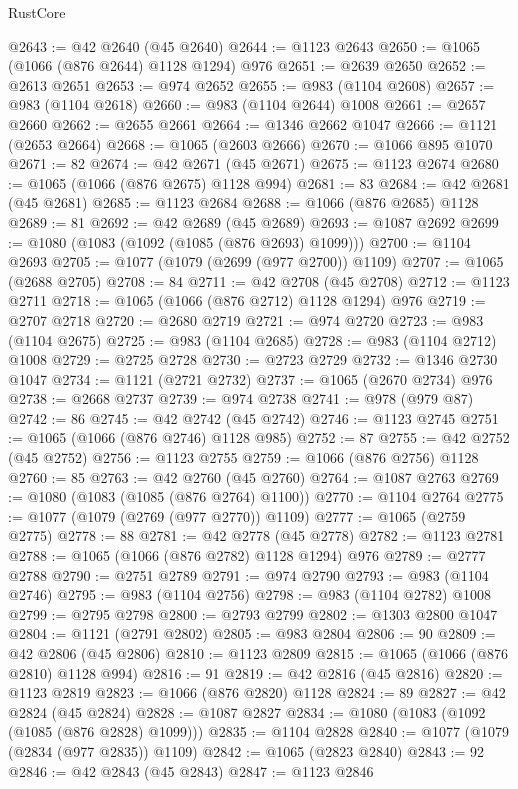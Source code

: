 \begin{lexlean}{RustCore}
\begin{coremodule}
@2643 := @42 @2640 (@45 @2640)
@2644 := @1123 @2643
@2650 := @1065 (@1066 (@876 @2644) @1128 @1294) @976
@2651 := @2639 @2650
@2652 := @2613 @2651
@2653 := @974 @2652
@2655 := @983 (@1104 @2608)
@2657 := @983 (@1104 @2618)
@2660 := @983 (@1104 @2644) @1008
@2661 := @2657 @2660
@2662 := @2655 @2661
@2664 := @1346 @2662 @1047
@2666 := @1121 (@2653 @2664)
@2668 := @1065 (@2603 @2666)
@2670 := @1066 @895 @1070
@2671 := 82
@2674 := @42 @2671 (@45 @2671)
@2675 := @1123 @2674
@2680 := @1065 (@1066 (@876 @2675) @1128 @994)
@2681 := 83
@2684 := @42 @2681 (@45 @2681)
@2685 := @1123 @2684
@2688 := @1066 (@876 @2685) @1128
@2689 := 81
@2692 := @42 @2689 (@45 @2689)
@2693 := @1087 @2692
@2699 := @1080 (@1083 (@1092 (@1085 (@876 @2693) @1099)))
@2700 := @1104 @2693
@2705 := @1077 (@1079 (@2699 (@977 @2700)) @1109)
@2707 := @1065 (@2688 @2705)
@2708 := 84
@2711 := @42 @2708 (@45 @2708)
@2712 := @1123 @2711
@2718 := @1065 (@1066 (@876 @2712) @1128 @1294) @976
@2719 := @2707 @2718
@2720 := @2680 @2719
@2721 := @974 @2720
@2723 := @983 (@1104 @2675)
@2725 := @983 (@1104 @2685)
@2728 := @983 (@1104 @2712) @1008
@2729 := @2725 @2728
@2730 := @2723 @2729
@2732 := @1346 @2730 @1047
@2734 := @1121 (@2721 @2732)
@2737 := @1065 (@2670 @2734) @976
@2738 := @2668 @2737
@2739 := @974 @2738
@2741 := @978 (@979 @87)
@2742 := 86
@2745 := @42 @2742 (@45 @2742)
@2746 := @1123 @2745
@2751 := @1065 (@1066 (@876 @2746) @1128 @985)
@2752 := 87
@2755 := @42 @2752 (@45 @2752)
@2756 := @1123 @2755
@2759 := @1066 (@876 @2756) @1128
@2760 := 85
@2763 := @42 @2760 (@45 @2760)
@2764 := @1087 @2763
@2769 := @1080 (@1083 (@1085 (@876 @2764) @1100))
@2770 := @1104 @2764
@2775 := @1077 (@1079 (@2769 (@977 @2770)) @1109)
@2777 := @1065 (@2759 @2775)
@2778 := 88
@2781 := @42 @2778 (@45 @2778)
@2782 := @1123 @2781
@2788 := @1065 (@1066 (@876 @2782) @1128 @1294) @976
@2789 := @2777 @2788
@2790 := @2751 @2789
@2791 := @974 @2790
@2793 := @983 (@1104 @2746)
@2795 := @983 (@1104 @2756)
@2798 := @983 (@1104 @2782) @1008
@2799 := @2795 @2798
@2800 := @2793 @2799
@2802 := @1303 @2800 @1047
@2804 := @1121 (@2791 @2802)
@2805 := @983 @2804
@2806 := 90
@2809 := @42 @2806 (@45 @2806)
@2810 := @1123 @2809
@2815 := @1065 (@1066 (@876 @2810) @1128 @994)
@2816 := 91
@2819 := @42 @2816 (@45 @2816)
@2820 := @1123 @2819
@2823 := @1066 (@876 @2820) @1128
@2824 := 89
@2827 := @42 @2824 (@45 @2824)
@2828 := @1087 @2827
@2834 := @1080 (@1083 (@1092 (@1085 (@876 @2828) @1099)))
@2835 := @1104 @2828
@2840 := @1077 (@1079 (@2834 (@977 @2835)) @1109)
@2842 := @1065 (@2823 @2840)
@2843 := 92
@2846 := @42 @2843 (@45 @2843)
@2847 := @1123 @2846

\end{coremodule}
\end{lexlean}
